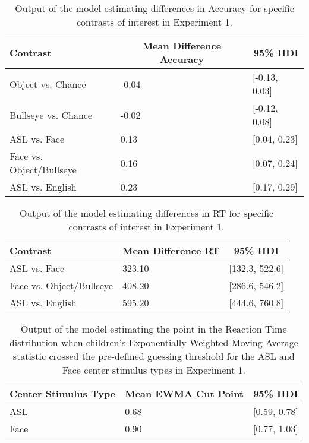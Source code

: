 \documentclass[,man,floatsintext]{apa6}
\begin{document}
\begin{appendix}
\begin{table}[h]
\begin{center}
\begin{threeparttable}
\caption{\label{tab:trio-acc-contrasts}Output of the model estimating differences in Accuracy for specific contrasts of interest in Experiment 1.}
\begin{tabular}{lll}
\toprule
Contrast & \multicolumn{1}{c}{Mean Difference Accuracy} & \multicolumn{1}{c}{95\% HDI}\\
\midrule
Object vs. Chance & -0.04 & [-0.13, 0.03]\\
Bullseye vs. Chance & -0.02 & [-0.12, 0.08]\\
ASL vs. Face & 0.13 & [0.04, 0.23]\\
Face vs. Object/Bullseye & 0.16 & [0.07, 0.24]\\
ASL vs. English & 0.23 & [0.17, 0.29]\\
\bottomrule
\end{tabular}
\end{threeparttable}
\end{center}
\end{table}

\begin{table}[h]
\begin{center}
\begin{threeparttable}
\caption{\label{tab:trio-rt-contrasts}Output of the model estimating differences in RT for specific contrasts of interest in Experiment 1.}
\begin{tabular}{lll}
\toprule
Contrast & \multicolumn{1}{c}{Mean Difference RT} & \multicolumn{1}{c}{95\% HDI}\\
\midrule
ASL vs. Face & 323.10 & [132.3, 522.6]\\
Face vs. Object/Bullseye & 408.20 & [286.6, 546.2]\\
ASL vs. English & 595.20 & [444.6, 760.8]\\
\bottomrule
\end{tabular}
\end{threeparttable}
\end{center}
\end{table}

\begin{table}[h]
\begin{center}
\begin{threeparttable}
\caption{\label{tab:trio-ewma-cuts}Output of the model estimating the point in the Reaction Time distribution when children's Exponentially Weighted Moving Average statistic crossed the pre-defined guessing threshold for the ASL and Face center stimulus types in Experiment 1.}
\begin{tabular}{lll}
\toprule
Center Stimulus Type & \multicolumn{1}{c}{Mean EWMA Cut Point} & \multicolumn{1}{c}{95\% HDI}\\
\midrule
ASL & 0.68 & [0.59, 0.78]\\
Face & 0.90 & [0.77, 1.03]\\
\bottomrule
\end{tabular}
\end{threeparttable}
\end{center}
\end{table}


\end{appendix}
\end{document}
